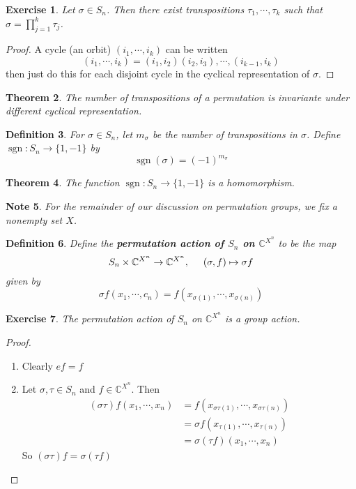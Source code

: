 \documentclass[12pt]{amsart}
\newtheorem{thm}{Theorem}[section]
\newtheorem{defn}[thm]{Definition}
\newtheorem{note}[thm]{Note}
\newtheorem{ex}[thm]{Exercise}
\newcommand{\sig}{\sigma}
\newcommand{\C}{\mathbb{C}}
\DeclareMathOperator{\sgn}{sgn}
\begin{document}
\begin{ex}
	Let $\sig \in S_n$. Then there exist transpositions $\tau_1, \cdots, \tau_k$ such that $\sig = \prod_{j=1}^k \tau_j$.
\end{ex}

\begin{proof}
	A cycle (an orbit) $(i_1, \cdots, i_k)$ can be written $$(i_1, \cdots, i_k) = (i_1, i_2)(i_2, i_3), \cdots, (i_{k-1}, i_k)$$ then just do this for each disjoint cycle in the cyclical representation of $\sig$.
\end{proof}

\begin{thm}
	The number of transpositions of a permutation is invariante under different cyclical representation.
\end{thm}

\begin{defn}
	For $\sig \in S_n$, let $m_{\sig}$ be the number of transpositions in $\sig$. Define $\sgn: S_n \rightarrow \{1, -1\}$ by $$\sgn(\sig) = (-1)^{m_{\sig}} $$
\end{defn}

\begin{thm}
	The function $\sgn: S_n \rightarrow \{1, -1\}$ is a homomorphism.
\end{thm}


\begin{note}
	For the remainder of our discussion on permutation groups, we fix a nonempty set $X$.
\end{note}

\begin{defn}
	Define the \textbf{permutation action of $S_n$ on $\C^{X^n}$} to be the map $$S_n \times \C^{X^n} \rightarrow \C^{X^n}, \hspace{ .5cm } (\sig, f) \mapsto \sig f$$  given by $$\sig f(x_1, \cdots, c_n) = f(x_{\sig(1)}, \cdots, x_{\sig(n)})$$
\end{defn}

\begin{ex}
	The permutation action of $S_n$ on $\C^{X^n}$ is a group action.
\end{ex}

\begin{proof}\
	\begin{enumerate}
		\item Clearly $e f = f$
		\item Let $\sig, \tau \in S_n$ and $f \in \C^{X^n}$. Then 
		\begin{align*}
			 (\sig \tau) f(x_1, \cdots, x_n)
			&= f(x_{\sig \tau(1)}, \cdots, x_{\sig \tau(n)}) \\
			&= \sig f(x_{\tau(1)}, \cdots, x_{\tau (n)}) \\
			&= \sig (\tau f)(x_1, \cdots, x_n)
		\end{align*}
	So $(\sig \tau) f = \sig(\tau f)$
	\end{enumerate}
\end{proof}
\end{document}
